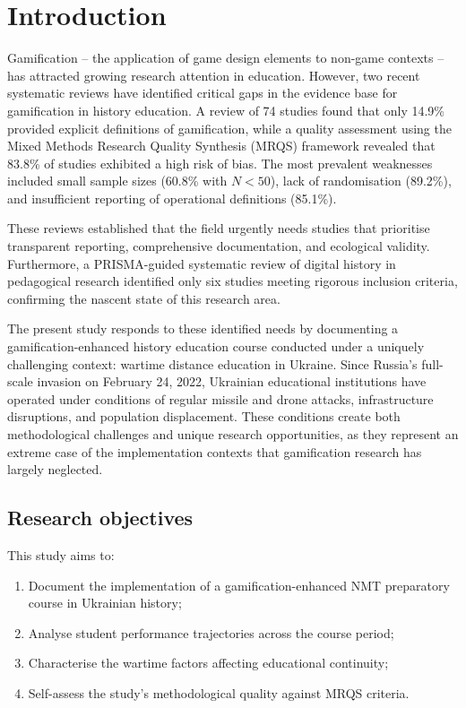 \documentclass[review]{elsarticle}
\begin{document}
\section{Introduction}

Gamification -- the application of game design elements to non-game contexts \citep{Deterding2011} -- has attracted growing research attention in education. However, two recent systematic reviews have identified critical gaps in the evidence base for gamification in history education. A review of 74 studies \citep{KorniienkoSemerikov2024} found that only 14.9\% provided explicit definitions of gamification, while a quality assessment using the Mixed Methods Research Quality Synthesis (MRQS) framework \citep{Korniienko2025mrqs} revealed that 83.8\% of studies exhibited a high risk of bias. The most prevalent weaknesses included small sample sizes (60.8\% with $N<50$), lack of randomisation (89.2\%), and insufficient reporting of operational definitions (85.1\%).

These reviews established that the field urgently needs studies that prioritise transparent reporting, comprehensive documentation, and ecological validity. Furthermore, a PRISMA-guided systematic review of digital history in pedagogical research \citep{Korniienko2025cte} identified only six studies meeting rigorous inclusion criteria, confirming the nascent state of this research area.

The present study responds to these identified needs by documenting a gamification-enhanced history education course conducted under a uniquely challenging context: wartime distance education in Ukraine. Since Russia's full-scale invasion on February 24, 2022, Ukrainian educational institutions have operated under conditions of regular missile and drone attacks, infrastructure disruptions, and population displacement. These conditions create both methodological challenges and unique research opportunities, as they represent an extreme case of the implementation contexts that gamification research has largely neglected.

\subsection{Research objectives}

This study aims to:
\begin{enumerate}
\item Document the implementation of a gamification-enhanced NMT preparatory course in Ukrainian history;
\item Analyse student performance trajectories across the course period;
\item Characterise the wartime factors affecting educational continuity;
\item Self-assess the study's methodological quality against MRQS criteria.
\end{enumerate}
\end{document}

